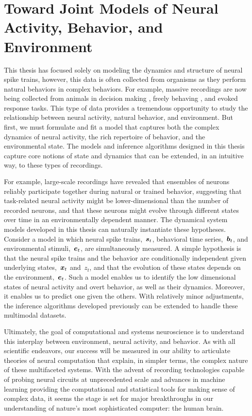 \section{Toward Joint Models of Neural Activity, Behavior, and Environment}
This thesis has focused solely on modeling the dynamics and structure
of neural spike trains, however, this data is often collected from
organisms as they perform natural behaviors in complex behaviors. For
example, massive recordings are now being collected from animals in
decision making \citep[e.g.][]{briggman2005optical}, freely behaving
\citep[e.g.][]{prevedel2014simultaneous}, and evoked response
\citep[e.g.][]{portugues2014whole} tasks.  This type of data provides
a tremendous opportunity to study the relationship between neural
activity, natural behavior, and environment. But first, we must
formulate and fit a model that captures both the complex dynamics of
neural activity, the rich repertoire of behavior, and the
environmental state. The models and inference algorithms designed in
this thesis capture core notions of state and dynamics that can be
extended, in an intuitive way, to these types of recordings. 

For example, large-scale recordings have revealed that ensembles of
neurons reliably participate together during natural or trained
behavior, suggesting that task-related neural activity might be
lower-dimensional than the number of recorded neurons, and that these
neurons might evolve through different states over time in an
environmentally dependent manner.  The dynamical system models
developed in this thesis can naturally instantiate these
hypotheses. Consider a model in which neural spike trains,~$\boldsymbol{s}_t$,
behavioral time series,~$\boldsymbol{b}_t$, and environmental stimuli,~$\boldsymbol{e}_t$,
are simultaneously measured. A simple hypothesis is that the neural
spike trains and the behavior are conditionally independent given
underlying states,~$\boldsymbol{x}_t$ and~$z_t$, and that the evolution of these
states depends on the environment,~$\boldsymbol{e}_t$. Such a model enables us to
identify the low dimensional states of neural activity and overt
behavior, as well as their dynamics. Moreover, it enables us to
predict one given the others. With relatively minor adjustments, the
inference algorithms developed previously can be extended to handle
these multimodal datasets.

Ultimately, the goal of computational and systems neuroscience is to
understand this interplay between environment, neural activity, and
behavior. As with all scientific endeavors, our success will be
measured in our ability to articulate theories of neural computation
that explain, in simpler terms, the complex nature of these
multifaceted systems.  With the advent of recording technologies
capable of probing neural circuits at unprecedented scale and
advances in machine learning providing the computational and
statistical tools for making sense of complex data, it seems the stage
is set for major breakthroughs in our understanding of nature's most
sophisticated computer: the human brain. 


